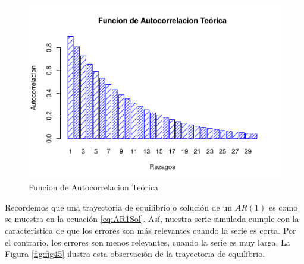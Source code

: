 \documentclass[
]{book}
\begin{document}
\begin{figure}

{\centering \includegraphics{Notas-Series-Tiempo_files/figure-latex/fig44-1} 

}

\caption{Funcion de Autocorrelacion Teórica}\label{fig:fig44}
\end{figure}

Recordemos que una trayectoria de equilibrio o solución de un \(AR(1)\) es como se muestra en la ecuación \eqref{eq:AR1Sol}. Así, nuestra serie simulada cumple con la característica de que los errores son más relevantes cuando la serie es corta. Por el contrario, los errores son menos relevantes, cuando la serie es muy larga. La Figura \ref{fig:fig45} ilustra esta observación de la trayectoria de equilibrio.
\end{document}
